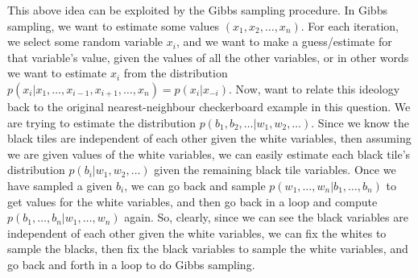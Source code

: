 This above idea can be exploited by the Gibbs sampling procedure. In Gibbs sampling, we want to estimate some values $(x_1, x_2, \dots, x_n)$. For each iteration, we select some random variable $x_i$, and we want to make a guess/estimate for that variable's value, given the values of all the other variables, or in other words we want to estimate $x_i$ from the distribution $p(x_i \vert x_1, \dots, x_{i-1}, x_{i+1}, \dots, x_n) = p(x_i \vert x_{-i})$. Now, want to relate this ideology back to the original nearest-neighbour checkerboard example in this question. We are trying to estimate the distribution $p(b_1, b_2, \dots \vert w_1, w_2, \dots)$. Since we know the black tiles are independent of each other given the white variables, then assuming we are given values of the white variables, we can easily estimate each black tile's distribution $p(b_i \vert w_1, w_2, \dots)$ given the remaining black tile variables. Once we have sampled a given $b_i$, we can go back and sample $p(w_1, \dots, w_n \vert b_1, \dots, b_n)$ to get values for the white variables, and then go back in a loop and compute $p(b_1, \dots, b_n \vert w_1, \dots, w_n)$ again. So, clearly, since we can see the black variables are independent of each other given the white variables, we can fix the whites to sample the blacks, then fix the black variables to sample the white variables, and go back and forth in a loop to do Gibbs sampling.